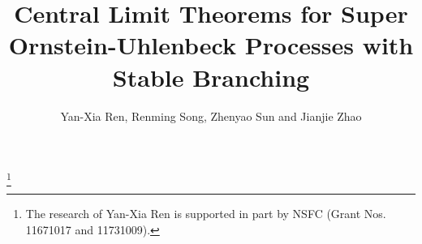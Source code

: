 \documentclass[12pt,a4paper]{amsart}
\theoremstyle{plain}
\theoremstyle{definition}
\numberwithin{equation}{section}
\begin{document}
\title
    [CLT for Super-OU processes]
 {Central Limit Theorems for Super Ornstein-Uhlenbeck Processes with Stable Branching}
\author
    [Y.-X. Ren, R. Song, Z. Sun and J. Zhao]
    {Yan-Xia Ren, Renming Song, Zhenyao Sun and Jianjie Zhao}
\address
    {Yan-Xia Ren\\
    LMAM School of Mathematical Sciences \& Center for
Statistical Science\\
    Peking University\\
    Beijing, P. R. China, 100871}
\thanks{The research of Yan-Xia Ren is supported in part by NSFC (Grant Nos. 11671017  and 11731009).}
\address
    {Zhenyao Sun\\
    School of Mathematical Sciences\\
    Peking University\\
    Beijing, P. R. China, 100871}
\address
    {Jianjie Zhao\\
    School of Mathematical Sciences\\
    Peking University\\
    Beijing, P. R. China, 100871}
\maketitle
\end{document}

